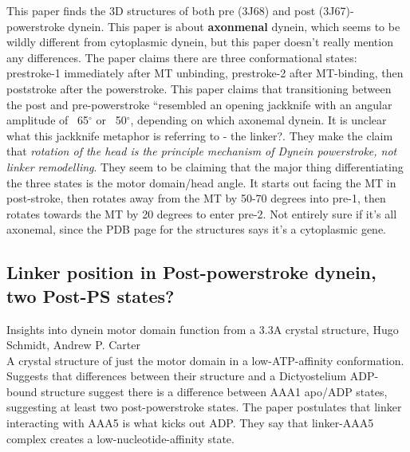 \documentclass[10pt]{article} %
\begin{document}
This paper finds the 3D structures of both pre (3J68) and post (3J67)-powerstroke dynein. This paper is about \textbf{axonmenal} dynein, which seems to be wildly different from cytoplasmic dynein, but this paper doesn't really mention any differences. The paper claims there are three conformational states: prestroke-1 immediately after MT unbinding, prestroke-2 after MT-binding, then poststroke after the powerstroke. This paper claims that transitioning between the post and pre-powerstroke ``resembled an opening jackknife with an angular amplitude of ~65$^{\circ}$ or ~50$^{\circ}$, depending on which axonemal dynein. It is unclear what this jackknife metaphor is referring to - the linker?. They make the claim that \textit{rotation of the head is the principle mechanism of Dynein powerstroke, not linker remodelling}. They seem to be claiming that the major thing differentiating the three states is the motor domain/head angle. It starts out facing the MT in post-stroke, then rotates away from the MT by 50-70 degrees into pre-1, then rotates towards the MT by 20 degrees to enter pre-2. Not entirely sure if it's all axonemal, since the PDB page for the structures says it's a cytoplasmic gene.\\


\subsection{Linker position in Post-powerstroke dynein, two Post-PS states?}
Insights into dynein motor domain function from a 3.3A crystal structure, Hugo Schmidt, Andrew P. Carter\\

A crystal structure of just the motor domain in a low-ATP-affinity conformation. Suggests that differences between their structure and a Dictyostelium ADP-bound structure suggest there is a difference between AAA1 apo/ADP states, suggesting at least two post-powerstroke states. The paper postulates that linker interacting with AAA5 is what kicks out ADP. They say that linker-AAA5 complex creates a low-nucleotide-affinity state.\\
\end{document}
